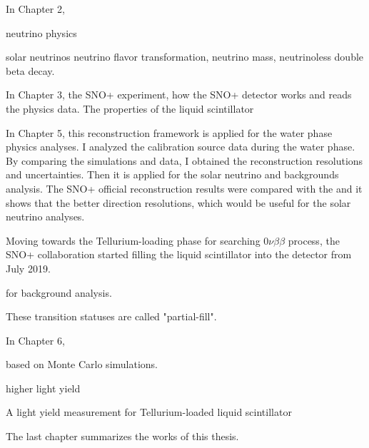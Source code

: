 In Chapter 2, 

neutrino physics

solar neutrinos
neutrino flavor transformation, neutrino mass, neutrinoless double beta decay.

In Chapter 3, the SNO+ experiment, how the SNO+ detector works and reads the physics data.
The properties of the liquid scintillator


In Chapter 5, this reconstruction framework is applied for the water phase physics analyses. I analyzed the calibration source data during the water phase. By comparing the simulations and data, I obtained the reconstruction resolutions and uncertainties. Then it is applied for the solar neutrino and backgrounds analysis.
The SNO+ official reconstruction results were compared with the and it shows that the better direction resolutions, which would be useful for the solar neutrino analyses.

Moving towards the Tellurium-loading phase for searching $0\nu\beta\beta$ process, the SNO+ collaboration started filling the liquid scintillator into the detector from July 2019. 

for background analysis.

These transition statuses are called "partial-fill".  

In Chapter 6, 

based on Monte Carlo simulations.

higher light yield

A light yield measurement for Tellurium-loaded liquid scintillator

The last chapter summarizes the works of this thesis.